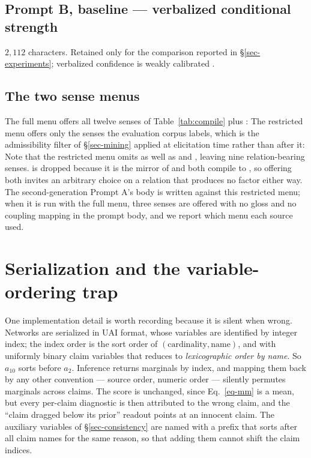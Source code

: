 \subsection{Prompt B, baseline --- verbalized conditional strength}
\label{app-prompt-b2}
$2{,}112$ characters. Retained only for the comparison reported in \S\ref{sec-experiments}; verbalized
confidence is weakly calibrated \citep{xiong}.

\subsection{The two sense menus}
\label{app-menus}
The full menu offers all twelve senses of Table~\ref{tab:compile} plus :
The restricted menu offers only the senses the evaluation corpus labels, which is the admissibility
filter of \S\ref{sec-mining} applied at elicitation time rather than after it:
Note that the restricted menu omits  as well as  and
, leaving nine relation-bearing senses.  is dropped because it is
the mirror of  and both compile to , so offering both invites an
arbitrary choice on a relation that produces no factor either way. The second-generation Prompt A's body
is written against this restricted menu; when it is run with the full menu, three senses are offered
with no gloss and no coupling mapping in the prompt body, and we report which menu each source used.


\section{Serialization and the variable-ordering trap}
\label{app-uai}

One implementation detail is worth recording because it is silent when wrong. Networks are serialized in
UAI format, whose variables are identified by integer index; the index order is the sort order of
$(\text{cardinality},\text{name})$, and with uniformly binary claim variables that reduces to
\emph{lexicographic order by name}. So $a_{10}$ sorts before $a_2$. Inference returns marginals by
index, and mapping them back by any other convention --- source order, numeric order --- silently
permutes marginals across claims. The score is unchanged, since Eq.~\ref{eq-mm} is a mean, but every
per-claim diagnostic is then attributed to the wrong claim, and the ``claim dragged below its prior''
readout points at an innocent claim. The auxiliary variables of \S\ref{sec-consistency} are named with a
prefix that sorts after all claim names for the same reason, so that adding them cannot shift the claim
indices.



